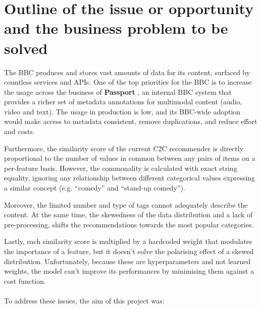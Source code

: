 
\section{Outline of the issue or opportunity and the business problem to be solved}

The BBC produces and stores vast amounts of data for its content, surfaced by countless services and APIs.
One of the top priorities for the BBC is to increase the usage across the business of \textbf{Passport} \cite{BBC:PassportMetadata},
an internal BBC system that provides a richer set of metadata annotations for multimodal content (audio, video and text).
The usage in production is low, and its BBC-wide adoption would make access to metadata consistent, remove duplications, and reduce effort and costs.

Furthermore, the similarity score of the current C2C recommender is directly proportional to the number of values in common between any pairs of items
on a per-feature basis. However, the commonality is calculated with exact string equality, ignoring any relationship between different
categorical values expressing a similar concept (e.g. ``comedy'' and ``stand-up comedy'').

Moreover, the limited number and type of tags cannot adequately describe the content.
At the same time, the skewedness of the data distribution and a lack of pre-processing, shifts the recommendations towards the most popular categories.

Lastly, each similarity score is multiplied by a hardcoded weight that modulates the importance of a feature, but it doesn't solve
the polarising effect of a skewed distribution. Unfortunately, because these are hyperparameters and not learned weights, the model can't improve
its performances by minimising them against a cost function.
\\ \\
To address these issues, the aim of this project was:

